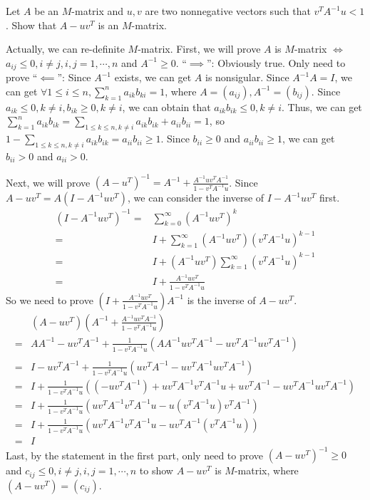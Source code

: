 \documentclass{ctexart}
\begin{document}
\begin{problem}  
  Let \(A \) be an \(M \)-matrix and \(u,v \) are two nonnegative vectors such 
  that \(v^T A^{-1} u <1 \). Show that \(A-uv^T \) is an \(M \)-matrix.
\end{problem}
\begin{solution}
 Actually, we can  re-definite \(M\)-matrix. First, we will prove \(A \) is \(M \)-matrix \(\iff \) \(a_{ij} \leq 0, i \neq j, i,j =1,\cdots,n \) 
  and \(A^{-1} \geq 0 \).
  ``\(\implies\)'': Obviously true. Only need to prove ``\(\impliedby\)'': Since \(A^{-1} \) exists, we can get \(A \) is nonsigular. 
  Since \(A^{-1}A=I \), we can get \(\forall 1 \leq i \leq n, \sum_{k=1}^{n}a_{ik}b_{ki}=1\), where \(A=(a_{ij}), A^{-1}=(b_{ij}) \). Since \(a_{ik} \leq 0, k \neq i , b_{ik} \geq 0,k \neq i \), 
  we can obtain that \(a_{ik}b_{ik} \leq 0, k \neq i \).
  Thus, we can get \(\sum_{k=1}^{n}a_{ik}b_{ik}=\sum_{1 \leq k \leq n, k \neq i}a_{ik}b_{ik} + a_{ii}b_{ii} =1 \), so \(1-\sum_{1 \leq k \leq n, k \neq i}a_{ik}b_{ik}=a_{ii}b_{ii}\geq 1 \). 
  Since \(b_{ii} \geq 0 \) and \(a_{ii}b_{ii} \geq 1 \), we can get \(b_{ii}>0 \) and \(a_{ii}>0 \). 

  Next, we will prove \((A-u^T)^{-1}=A^{-1} + \frac{A^{-1}uv^TA^{-1}}{1-v^TA^{-1}u} \). Since \(A-uv^T=A(I-A^{-1}uv^T) \), we can consider the inverse of \(I-A^{-1}uv^T \) first. 
  \[
    \begin{aligned}
      (I-A^{-1}uv^T)^{-1}=&\sum_{k=0}^{\infty}(A^{-1}uv^T)^k\\ 
      =& I + \sum_{k=1}^{\infty}(A^{-1}uv^T)(v^TA^{-1}u)^{k-1}\\ 
      =&I + (A^{-1}uv^T)\sum_{k=1}^{\infty}(v^TA^{-1}u)^{k-1}\\ 
      =&I +\frac{A^{-1}uv^T}{1-v^TA^{-1}u}
    \end{aligned}
  \]
  So we need to prove \((I + \frac{A^{-1}uv^T}{1-v^TA^{-1}u})A^{-1} \) is the inverse of \(A-uv^T \). 
  \[
    \begin{aligned}
      &(A-uv^T)(A^{-1} + \frac{A^{-1}uv^TA^{-1}}{1-v^TA^{-1}u})\\
  =&AA^{-1} - uv^TA^{-1} + \frac{1}{1-v^TA^{-1}u}(AA^{-1}uv^TA^{-1}-uv^TA^{-1}uv^TA^{-1})\\ \\
      =&I -uv^TA^{-1} + \frac{1}{1-v^TA^{-1}u}(uv^TA^{-1}-uv^TA^{-1}uv^TA^{-1})\\ 
      =&I + \frac{1}{1-v^TA^{-1}u}((-uv^TA^{-1}) + uv^TA^{-1}v^TA^{-1}u + uv^TA^{-1} -uv^TA^{-1}uv^TA^{-1})\\ 
      =&I + \frac{1}{1-v^TA^{-1}u}(uv^TA^{-1}v^TA^{-1}u - u(v^TA^{-1}u)v^TA^{-1})\\ 
      =&I + \frac{1}{1-v^TA^{-1}u}(uv^TA^{-1}v^TA^{-1}u-uv^TA^{-1}(v^TA^{-1}u))\\ 
      =&I
    \end{aligned}
  \]
  Last, by the statement in the first part, only need to prove \((A-uv^T)^{-1} \geq 0 \) and \( c_{ij} \leq 0, i \neq j, i,j =1,\cdots,n\)
  to show \(A-uv^T \) is \(M \)-matrix, where \((A-uv^T)=(c_{ij}) \).
 

\end{solution}
\end{document}
